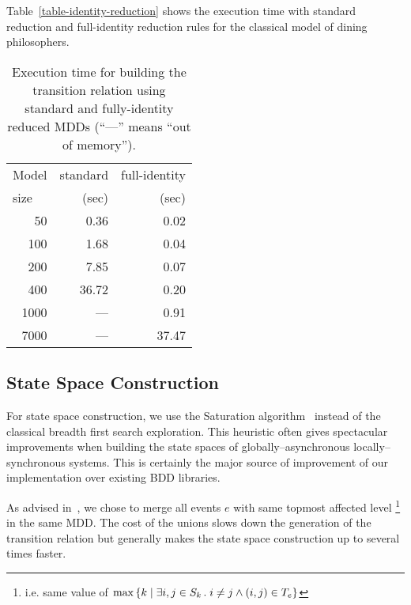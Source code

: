 \documentclass[nocover]             %
{NASA}                       %
\begin{document}
Table~\vref{table-identity-reduction} shows the execution time
with standard reduction and full-identity reduction rules for the classical model
of dining philosophers.
\begin{table}[htbp]
  \centering
  \begin{tabular}{|r||r|r|}
    \hline
    \multicolumn{1}{|l||}{Model} & standard & full-identity \\
    \multicolumn{1}{|l||}{size}  & (sec) & (sec) \\
    \hline
      50 & 0.36& 0.02\\
     100 & 1.68& 0.04\\
     200 & 7.85& 0.07\\
     400 &36.72& 0.20\\
    1000 &  ---& 0.91\\
    7000 &  ---&37.47\\
    \hline
  \end{tabular}
\vspace*{3mm}
  \caption{Execution time for building the transition relation
using standard and fully-identity reduced MDDs (``---'' means ``out of memory'').}
  \label{table-identity-reduction}
\end{table}

\subsection{State Space Construction}

For state space construction, we use the Saturation algorithm~\cite{Saturation2001}
instead of the classical breadth first search exploration. This heuristic
often gives spectacular improvements when building the state spaces
of globally--asynchronous locally--synchronous systems.
This is certainly the major source of improvement of our implementation
over existing BDD libraries.

As advised in~\cite{Ciardo2005}, we chose to merge all events $e$
with same topmost affected level%
\footnote{i.e. same value of ${\rm max}\left\{k\;|\;\exists i, j \in S_k\,.\; i \neq j \land (i, j) \in T_e \right\}$}
in the same MDD. The cost of the unions slows down the generation of the transition relation
but generally makes the state space construction up to several times faster.
\end{document}
